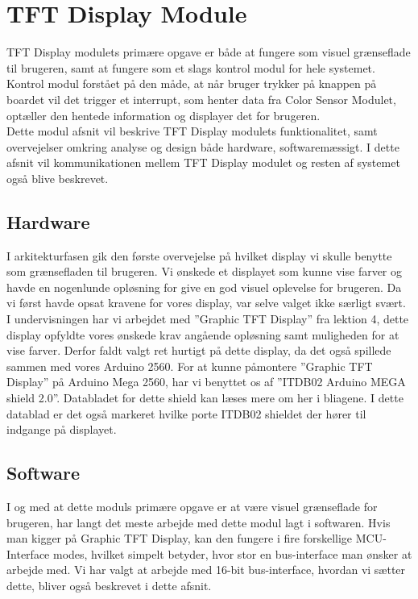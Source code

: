 \graphicspath{{Chapters/Struktur/}}

\section{TFT Display Module}
TFT Display modulets primære opgave er både at fungere som visuel grænseflade til brugeren, samt at fungere som et slags kontrol modul for hele systemet. Kontrol modul forstået på den måde, at når bruger trykker på knappen på boardet vil det trigger et interrupt, som henter data fra Color Sensor Modulet, optæller den hentede information og displayer det for brugeren.\\ Dette modul afsnit vil beskrive TFT Display modulets funktionalitet, samt overvejelser omkring analyse og design både hardware, softwaremæssigt. I dette afsnit vil kommunikationen mellem TFT Display modulet og resten af systemet også blive beskrevet. 

\subsection{Hardware}
I arkitekturfasen gik den første overvejelse på hvilket display vi skulle benytte som grænsefladen til brugeren. Vi ønskede et displayet som kunne vise farver og havde en nogenlunde opløsning for give en god visuel oplevelse for brugeren. Da vi først havde opsat kravene for vores display, var selve valget ikke særligt svært. I undervisningen har vi arbejdet med ”Graphic TFT Display” fra lektion 4, dette display opfyldte vores ønskede krav angående opløsning samt muligheden for at vise farver. Derfor faldt valgt ret hurtigt på dette display, da det også spillede sammen med vores Arduino 2560. For at kunne påmontere ”Graphic TFT Display” på Arduino Mega 2560, har vi benyttet os af ”ITDB02 Arduino MEGA shield 2.0”. Databladet for dette shield kan læses mere om her i bliagene\cite{man:ITDB02}. I dette datablad er det også markeret hvilke porte ITDB02 shieldet der hører til indgange på displayet.

\subsection{Software}
I og med at dette moduls primære opgave er at være visuel grænseflade for brugeren, har langt det meste arbejde med dette modul lagt i softwaren. 
Hvis man kigger på Graphic TFT Display, kan den fungere i fire forskellige MCU-Interface modes, hvilket simpelt betyder, hvor stor en bus-interface man ønsker at arbejde med. Vi har valgt at arbejde med 16-bit bus-interface, hvordan vi sætter dette, bliver også beskrevet i dette afsnit. 

